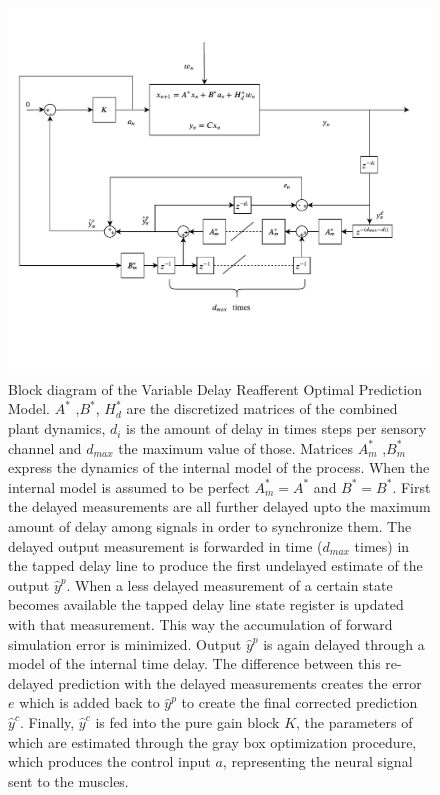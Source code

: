  \begin{figure}[ht]
    \centering

    \includegraphics[width=\linewidth,trim={0 2.8cm 0 2cm},clip]{images/VDROP_block.pdf}
    \caption{Block diagram of the Variable Delay Reafferent Optimal Prediction Model. \ensuremath{A^*} ,\ensuremath{B^*}, \ensuremath{H_d^*} are the discretized matrices of the combined plant dynamics, \ensuremath{d_i} is the amount of delay in times steps per sensory channel and \ensuremath{d_{max}} the maximum value of those. Matrices \ensuremath{A_m^*} ,\ensuremath{B_m^*} express the dynamics of the internal model of the process. When the internal model is assumed to be perfect \ensuremath{A_m^*=A^*} and \ensuremath{B^*=B^*}. First the delayed measurements are all further delayed upto the maximum amount of delay among signals  in order to synchronize them.  The delayed output measurement  is forwarded in time (\ensuremath{d_{max}} times) in the tapped delay line to produce the first undelayed estimate of the output \ensuremath{\hat{y}^p}. When a less delayed measurement  of a certain state becomes available the tapped delay line  state register is updated with that measurement. This way the accumulation of forward simulation error is minimized. Output \ensuremath{\hat{y}^p} is again delayed through a model of the  internal time delay. The difference between this re-delayed prediction with the delayed measurements creates the error \ensuremath{e} which is added back to  \ensuremath{\hat{y}^p}  to create the final corrected prediction \ensuremath{\hat{y}^c}. Finally, \ensuremath{\hat{y}^c} is fed into the pure gain block \ensuremath{K}, the parameters of which are estimated through the gray box optimization procedure, which produces the control input \ensuremath{a}, representing the neural signal sent to the muscles.}
    \label{fig:paper4}
\end{figure}


